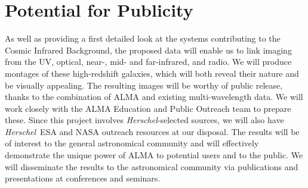 \documentclass[11pt,a4paper]{article}
\newcommand{\herschel}{{\it Herschel}}
\newcommand{\micron}{$\mu$m}
\begin{document}

\section{Potential for Publicity}



As well as providing a first detailed look at the
systems contributing to the Cosmic Infrared Background, the proposed
data will enable us to link imaging from the UV, optical, near-, mid-
and far-infrared, and radio. We will produce montages of these
high-redshift galaxies, which will both reveal their nature and be
visually appealing. The resulting images will be worthy of public release,
thanks to the combination of ALMA and existing
multi-wavelength data.  We
will work closely with the ALMA Education and Public Outreach team to
prepare these. Since this project involves \herschel-selected sources,
we will also have \herschel\ ESA and NASA outreach resources at our
disposal. The results will be of interest to the general astronomical
community and will effectively demonstrate the unique power of ALMA to
potential users and to the public.  We will disseminate the results to
the astronomical community via publications and presentations at
conferences and seminars.

\end{document}
